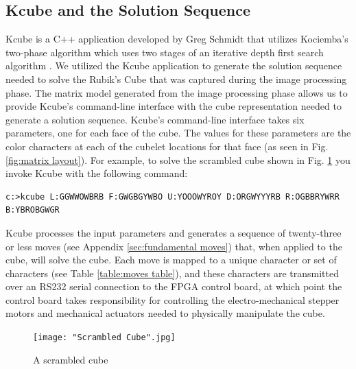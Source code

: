 \documentclass[final, letterpaper, 10 pt, conference, onecolumn]{IEEEtran}
\begin{document}
\subsection{Kcube and the Solution Sequence}
\label{sec:Kcube}
Kcube is a C++ application developed by Greg Schmidt that utilizes Kociemba's two-phase algorithm which uses two stages of an iterative depth first search algorithm \cite{TheTwo-PhaseAlgorithm}. We utilized the Kcube application to generate the solution sequence needed to solve the Rubik's Cube that was captured during the image processing phase. The matrix model generated from the image processing phase allows us to provide Kcube's command-line interface with the cube representation needed to generate a solution sequence. Kcube's command-line interface takes six parameters, one for each face of the cube. The values for these parameters are the color characters at each of the cubelet locations for that face (as seen in Fig. \ref{fig:matrix layout}). For example, to solve the scrambled cube shown in Fig. \ref{fig:scrambled cube} you invoke Kcube with the following command:

\begin{lstlisting}[style=DOS]
c:>kcube L:GGWWOWBRB F:GWGBGYWBO U:YOOOWYROY D:ORGWYYYRB R:OGBBRYWRR B:YBROBGWGR
\end{lstlisting}

Kcube processes the input parameters and generates a sequence of twenty-three or less moves (see Appendix \ref{sec:fundamental moves}) that, when applied to the cube, will solve the cube. Each move is mapped to a unique character or set of characters (see Table \ref{table:moves table}), and these characters are transmitted over an RS232 serial connection to the FPGA control board, at which point the control board takes responsibility for controlling the electro-mechanical stepper motors and mechanical actuators needed to physically manipulate the cube.


\begin{figure}[!ht]
\centering
\texttt{[image: "Scrambled Cube".jpg]}
\caption{A scrambled cube}
\label{fig:scrambled cube}
\end{figure}
\end{document}
